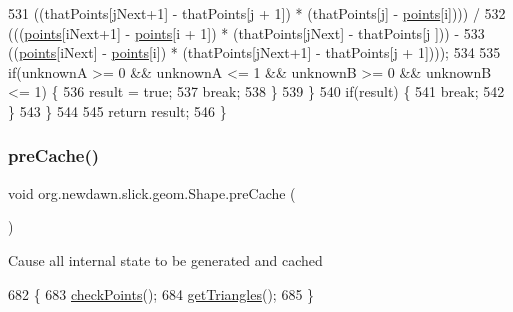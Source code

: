 \begin{DoxyCode}
531                         ((thatPoints[jNext+1] - thatPoints[j + 1]) * (thatPoints[j] - 
      \mbox{\hyperlink{classorg_1_1newdawn_1_1slick_1_1geom_1_1_shape_a8b4d4058734bbb3b96072e470b92aa37}{points}}[i]))) / 
532                         (((\mbox{\hyperlink{classorg_1_1newdawn_1_1slick_1_1geom_1_1_shape_a8b4d4058734bbb3b96072e470b92aa37}{points}}[iNext+1] - \mbox{\hyperlink{classorg_1_1newdawn_1_1slick_1_1geom_1_1_shape_a8b4d4058734bbb3b96072e470b92aa37}{points}}[i + 1]) * (thatPoints[jNext] - thatPoints[j
      ])) - 
533                                 ((\mbox{\hyperlink{classorg_1_1newdawn_1_1slick_1_1geom_1_1_shape_a8b4d4058734bbb3b96072e470b92aa37}{points}}[iNext] - \mbox{\hyperlink{classorg_1_1newdawn_1_1slick_1_1geom_1_1_shape_a8b4d4058734bbb3b96072e470b92aa37}{points}}[i]) * (thatPoints[jNext+1] - 
      thatPoints[j + 1])));
534                 
535                 \textcolor{keywordflow}{if}(unknownA >= 0 && unknownA <= 1 && unknownB >= 0 && unknownB <= 1) \{
536                     result = \textcolor{keyword}{true};
537                     \textcolor{keywordflow}{break};
538                 \}
539             \}
540             \textcolor{keywordflow}{if}(result) \{
541                 \textcolor{keywordflow}{break};
542             \}
543         \}
544 
545         \textcolor{keywordflow}{return} result;
546     \}
\end{DoxyCode}
\mbox{\label{classorg_1_1newdawn_1_1slick_1_1geom_1_1_shape_a9ead69d3bcff8d39abd2a8858413b328}} 
\subsubsection{\texorpdfstring{pre\+Cache()}{preCache()}}
{\footnotesize\ttfamily void org.\+newdawn.\+slick.\+geom.\+Shape.\+pre\+Cache (\begin{DoxyParamCaption}{ }\end{DoxyParamCaption})\hspace{0.3cm}{\ttfamily [inline]}}

Cause all internal state to be generated and cached 
\begin{DoxyCode}
682                            \{
683         \mbox{\hyperlink{classorg_1_1newdawn_1_1slick_1_1geom_1_1_shape_a84293802d05e8666a441720bfc12745d}{checkPoints}}();
684         \mbox{\hyperlink{classorg_1_1newdawn_1_1slick_1_1geom_1_1_shape_a7c04b6dc494c3e84f7d74f54e58143de}{getTriangles}}();
685     \}
\end{DoxyCode}
\mbox{\label{classorg_1_1newdawn_1_1slick_1_1geom_1_1_shape_af774c060073478230c15b1b8f707cb09}} 
